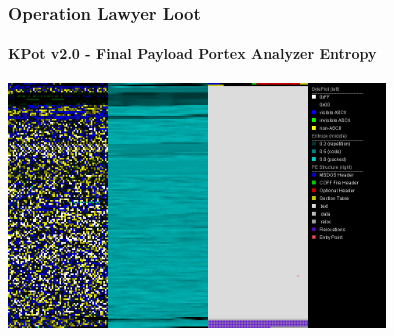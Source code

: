 \documentclass[aspectratio=169]{beamer}
\begin{document}
{
\begin{frame}
  \frametitle{Operation Lawyer Loot}
  \framesubtitle{KPot v2.0 - Final Payload Portex Analyzer Entropy}
  \begin{center}
    \includegraphics[width=10cm]{unpacked-portex-analyzer}
  \end{center}
\end{frame}
}
\end{document}
